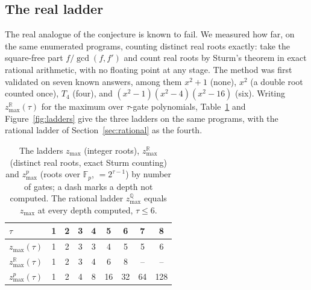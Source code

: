 \documentclass[11pt]{article}
\theoremstyle{definition}
\theoremstyle{remark}
\newcommand{\zmax}{z_{\max}}
\newcommand{\zpmax}{z^{p}_{\max}}
\newcommand{\zrmax}{z^{\mathbb{R}}_{\max}}
\newcommand{\zqmax}{z^{\mathbb{Q}}_{\max}}
\begin{document}
\subsection{The real ladder}\label{sec:real}

The real analogue of the conjecture is known to fail. We measured how far, on
the same enumerated programs, counting distinct real roots exactly: take the
square-free part $f/\gcd(f,f')$ and count real roots by Sturm's theorem in
exact rational arithmetic, with no floating point at any stage. The method
was first validated on seven known answers, among them $x^2+1$ (none), $x^2$ (a
double root counted once), $T_4$ (four), and $(x^2-1)(x^2-4)(x^2-16)$ (six).
Writing $\zrmax(\tau)$ for the maximum over $\tau$-gate polynomials, Table~\ref{tab:ladders}
and Figure~\ref{fig:ladders} give the three ladders on the same programs, with the rational
ladder of Section~\ref{sec:rational} as the fourth.

\begin{table}[t]
\centering
\caption{The ladders $\zmax$ (integer roots), $\zrmax$ (distinct real roots, exact Sturm
counting) and $\zpmax$ (roots over $\mathbb{F}_p$, $=2^{\tau-1}$) by number of gates; a dash
marks a depth not computed. The rational ladder $\zqmax$ equals $\zmax$ at every depth
computed, $\tau \le 6$.}
\label{tab:ladders}
\begin{tabular}{l|cccccccc}
\toprule
$\tau$            & 1 & 2 & 3 & 4 & 5 & 6 & 7 & 8\\\midrule
$\zmax(\tau)$     & 1 & 2 & 3 & 3 & 4 & 5 & 5 & 6\\
$\zrmax(\tau)$    & 1 & 2 & 3 & 4 & 6 & 8 & -- & --\\
$\zpmax(\tau)$    & 1 & 2 & 4 & 8 & 16 & 32 & 64 & 128\\
\bottomrule
\end{tabular}
\end{table}
\end{document}
